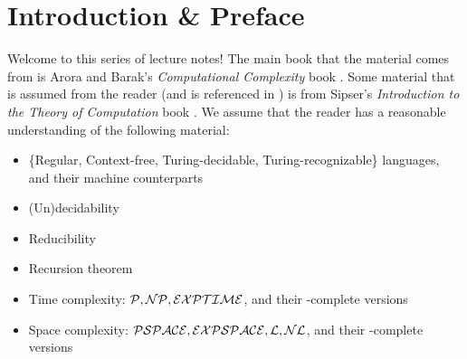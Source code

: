 \section{Introduction \& Preface}

Welcome to this series of lecture notes! The main book that the material comes from is Arora and Barak's \emph{Computational Complexity} book \cite{arora_baraz_computational_complexity}. Some material that is assumed from the reader (and is referenced in ) is from Sipser's \emph{Introduction to the Theory of Computation} book \cite{sipsertheoryofcomp}. We assume that the reader has a reasonable understanding of the following material:
\begin{itemize}
\item \{Regular, Context-free, Turing-decidable, Turing-recognizable\} languages, and their machine counterparts
\item (Un)decidability
\item Reducibility
\item Recursion theorem
\item Time complexity: $\mathcal{P}, \mathcal{NP}, \mathcal{EXPTIME}$, and their -complete versions
\item Space complexity: $\mathcal{PSPACE}, \mathcal{EXPSPACE}, \mathcal{L}, \mathcal{NL}$, and their -complete versions
\end{itemize}